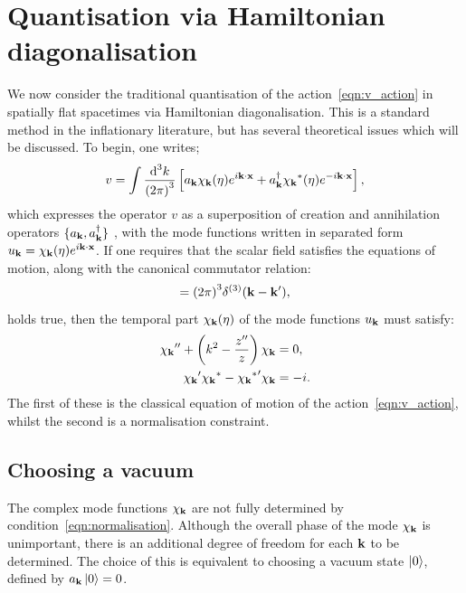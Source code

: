 \section{Quantisation via Hamiltonian diagonalisation}                                
\label{sec:mukhanov}
We now consider the traditional quantisation of the action~\eqref{eqn:v_action} in spatially flat spacetimes via Hamiltonian diagonalisation. This is a standard method in the inflationary literature, but has several theoretical issues which will be discussed. To begin, one writes;
\begin{equation}
  v = \int \frac{\d[3]{k}}{{(2\pi)}^3} \left[ a_\vk \chi_\vk(\eta)e^{i\vk\cdot\vx} + a_{\vk}^{\dagger} \str{\chi_\vk}(\eta)e^{-i\vk\cdot\vx} \right], 
  \label{eqn:v_quant}
\end{equation}
which expresses the operator \(v\) as a superposition of creation and annihilation operators \(\{a_{\mathbf{k}},a_{\mathbf{k}}^\dagger\}\) \citep{Mukhanov+2007}, with the mode functions written in separated form \({u_{\mathbf{k}} = \chi_{\mathbf{k}}(\eta) e^{i\mathbf{k}\cdot\mathbf{x}}}\). If one requires that the scalar field satisfies the equations of motion, along with the canonical commutator relation:
\begin{equation}
  [ a_\vk^{\phantom\dagger}, a_{\prm{\vk}}^{\dagger} ] = {(2\pi)}^3\delta^{(3)}(\vk-\prm{\vk}),
  \label{eqn:commutator}
\end{equation}
holds true, then the temporal part \(\chi_{\mathbf{k}}(\eta)\) of the mode functions \(u_{\mathbf{k}}\) must satisfy:
\begin{align}
  \dprm{\chi_\vk} + \left( k^2 - \frac{\dprm{z}}{z} \right)\chi_\vk &= 0,
  \label{eqn:mode_mukhanov}
  \\
  \prm{\chi_\vk} \str{\chi_\vk} - \prm{\str{\chi_\vk}} \chi_\vk &= -i.
  \label{eqn:normalisation}
\end{align}
The first of these is the classical equation of motion of the action~\eqref{eqn:v_action}, whilst the second is a normalisation constraint.

\subsection{Choosing a vacuum}
\label{sec:hamiltonian_diagonalisation}
The complex mode functions \(\chi_{\mathbf{k}}\) are not fully determined by condition~\eqref{eqn:normalisation}. Although the overall phase of the mode \(\chi_{\mathbf{k}}\) is unimportant, there is an additional degree of freedom for each \(\mathbf{k}\) to be determined. The choice of this is equivalent to choosing a vacuum state \(\left|0\right\rangle\), defined by \(a_{\mathbf{k}}\left|0\right\rangle=0\).

